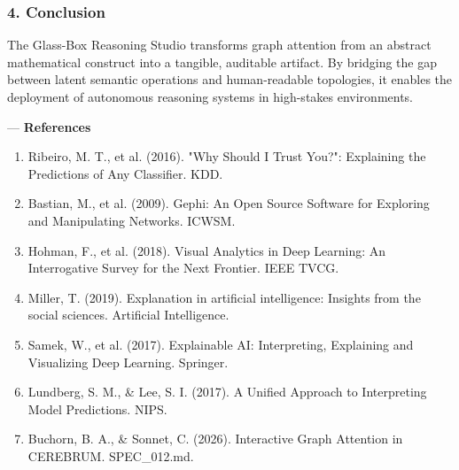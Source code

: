 \documentclass[10pt,journal,compsoc]{IEEEtran}
\begin{document}
\subsubsection{4. Conclusion}
The Glass-Box Reasoning Studio transforms graph attention from an abstract mathe\-matical construct into a tangible, auditable artifact. By bridging the gap between latent semantic operations and human-readable topologies, it enables the deployment of autonomous reasoning systems in high-stakes envir\-onments.

---
\textbf{References}
\begin{enumerate}
\item Ribeiro, M. T., et al. (2016). "Why Should I Trust You?": Explaining the Predictions of Any Classifier. KDD.
\item Bastian, M., et al. (2009). Gephi: An Open Source Software for Exploring and Manipu\-lating Networks. ICWSM.
\item Hohman, F., et al. (2018). Visual Analytics in Deep Learning: An Interr\-ogative Survey for the Next Frontier. IEEE TVCG.
\item Miller, T. (2019). Explanation in artificial intel\-ligence: Insights from the social sciences. Artificial Intell\-igence.
\item Samek, W., et al. (2017). Explainable AI: Interp\-reting, Explaining and Visualizing Deep Learning. Springer.
\item Lundberg, S. M., \& Lee, S. I. (2017). A Unified Approach to Interp\-reting Model Predictions. NIPS.
\item Buchorn, B. A., \& Sonnet, C. (2026). Interactive Graph Attention in CEREBRUM. SPEC\_012.md.

\end{enumerate}



\end{document}
